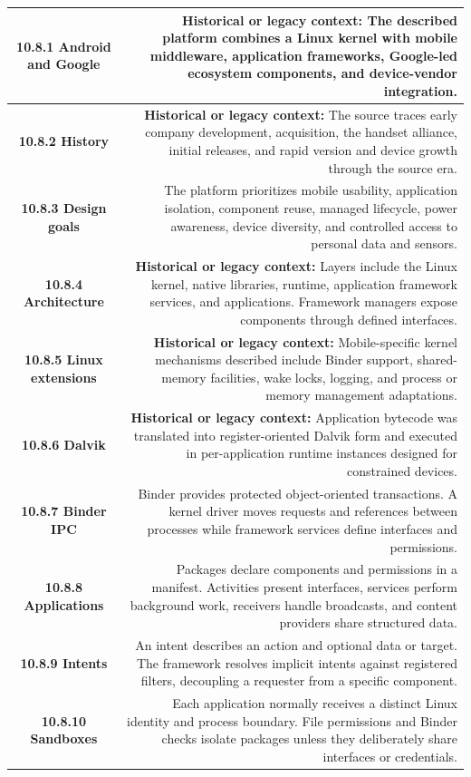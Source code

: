 \documentclass[10pt,letterpaper]{article}
\begin{document}
\begin{longtable}{C N}
\textbf{10.8.1 Android and Google} & \textcolor{legacy}{\textbf{Historical or legacy context:}} The described platform combines a Linux kernel with mobile middleware, application frameworks, Google-led ecosystem components, and device-vendor integration.\\\hline
\textbf{10.8.2 History} & \textcolor{legacy}{\textbf{Historical or legacy context:}} The source traces early company development, acquisition, the handset alliance, initial releases, and rapid version and device growth through the source era.\\\hline
\textbf{10.8.3 Design goals} & The platform prioritizes mobile usability, application isolation, component reuse, managed lifecycle, power awareness, device diversity, and controlled access to personal data and sensors.\\\hline
\textbf{10.8.4 Architecture} & \textcolor{legacy}{\textbf{Historical or legacy context:}} Layers include the Linux kernel, native libraries, runtime, application framework services, and applications. Framework managers expose components through defined interfaces.\\\hline
\textbf{10.8.5 Linux extensions} & \textcolor{legacy}{\textbf{Historical or legacy context:}} Mobile-specific kernel mechanisms described include Binder support, shared-memory facilities, wake locks, logging, and process or memory management adaptations.\\\hline
\textbf{10.8.6 Dalvik} & \textcolor{legacy}{\textbf{Historical or legacy context:}} Application bytecode was translated into register-oriented Dalvik form and executed in per-application runtime instances designed for constrained devices.\\\hline
\textbf{10.8.7 Binder IPC} & Binder provides protected object-oriented transactions. A kernel driver moves requests and references between processes while framework services define interfaces and permissions.\\\hline
\textbf{10.8.8 Applications} & Packages declare components and permissions in a manifest. Activities present interfaces, services perform background work, receivers handle broadcasts, and content providers share structured data.\\\hline
\textbf{10.8.9 Intents} & An intent describes an action and optional data or target. The framework resolves implicit intents against registered filters, decoupling a requester from a specific component.\\\hline
\textbf{10.8.10 Sandboxes} & Each application normally receives a distinct Linux identity and process boundary. File permissions and Binder checks isolate packages unless they deliberately share interfaces or credentials.\\\hline

\end{longtable}
\end{document}

